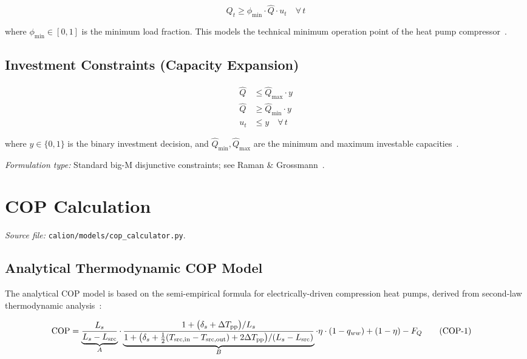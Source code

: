 \documentclass[a4paper,12pt]{article}
\newcommand{\COP}{\mathrm{COP}}
\begin{document}
\begin{equation}
  Q_{t} \geq \phi_{\min} \cdot \hat{Q} \cdot u_{t}
  \quad \forall\, t
  \tag{HP-4}
  \label{eq:hp4}
\end{equation}

where $\phi_{\min} \in [0,1]$ is the minimum load fraction. This models the technical
minimum operation point of the heat pump compressor~\cite{Wolf2014}.

\subsection{Investment Constraints (Capacity Expansion)}

\begin{align}
  \hat{Q} &\leq \hat{Q}_{\max} \cdot y
  \tag{HP-5}
  \label{eq:hp5} \\
  \hat{Q} &\geq \hat{Q}_{\min} \cdot y
  \tag{HP-6}
  \label{eq:hp6} \\
  u_{t}   &\leq y \quad \forall\, t
  \tag{HP-7}
  \label{eq:hp7}
\end{align}

where $y \in \{0,1\}$ is the binary investment decision, and
$\hat{Q}_{\min}, \hat{Q}_{\max}$ are the minimum and maximum investable
capacities~\cite{Morales2014,Morvaj2016}.

\noindent\textit{Formulation type:} Standard big-M disjunctive constraints; see
Raman \& Grossmann~\cite{Raman1994}.

\section{COP Calculation}
\label{sec:cop}

\textit{Source file:} \texttt{calion/models/cop\_calculator.py}.

\subsection{Analytical Thermodynamic COP Model}

The analytical COP model is based on the semi-empirical formula for electrically-driven
compression heat pumps, derived from second-law thermodynamic
analysis~\cite{Staffell2012,Ruhnau2019}:

\begin{align}
  \COP
  &= \underbrace{%
       \frac{L_s}{L_s - L_{\text{src}}}
     }_{A}
     \cdot
     \underbrace{%
       \frac{%
         1 + \bigl(\delta_s + \Delta T_{\text{pp}}\bigr) / L_s
       }{%
         1 + \bigl(\delta_s + \tfrac{1}{2}(T_{\text{src,in}} - T_{\text{src,out}})
             + 2\Delta T_{\text{pp}}\bigr)
             / (L_s - L_{\text{src}})
       }
     }_{B}
     \cdot \eta \cdot (1 - q_{ww})
     + (1 - \eta) - F_{Q}
  \tag{COP-1}
  \label{eq:cop1}
\end{align}
\end{document}
